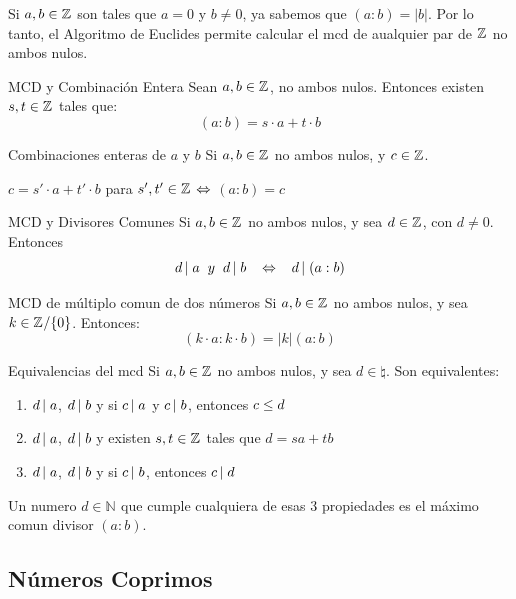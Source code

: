 \documentclass[10pt]{article}
\newcommand{\nat}[1]{\mathbb{N}^{#1}}
\begin{document}
\begin{obs}{}
 Si $a, b \in \entero{}$ son tales que $a=0$ y $b \neq 0$, ya sabemos que $(a:b) = |b|$. Por lo tanto, el Algoritmo de Euclides permite calcular el mcd de aualquier par de $\entero{}$ no ambos nulos.
\end{obs}

\begin{teo}{MCD y Combinación Entera}
 Sean $a, b \in \entero{}$, no ambos nulos. Entonces existen $s, t \in \entero{}$ tales que:
 \[(a:b) = s \cdot a + t \cdot b\]
\end{teo}

\begin{obs}{Combinaciones enteras de $a$ y $b$}
Si $a, b \in \entero{}$ no ambos nulos, y $c \in \entero{}$.
\begin{center}
 $c = s' \cdot a + t' \cdot b$ para $s', t' \in \entero{}$ $\sii$ $(a:b) = c$
\end{center}
\end{obs}

\begin{propo}{MCD y Divisores Comunes}
Si $a, b \in \entero{}$ no ambos nulos,  y sea $d \in \entero{}$, con $d \neq 0$. Entonces
\[\divi{d}{a} \es{0.2} y \es{0.2} \divi{d}{b} \es{0.3} \sii \es{0.3} \divi{d}{(a:b)}\]
\end{propo}

\begin{propo}{MCD de múltiplo comun de dos números}
 Si $a, b \in \entero{}$ no ambos nulos, y sea $k \in \entero{} / \{0\}$. Entonces:
 \[(k \cdot a : k \cdot b) = |k| (a:b)\]
\end{propo}

\begin{teo}{Equivalencias del mcd}
 Si $a, b \in \entero{}$ no ambos nulos,  y sea $d \in \natural{}$. Son equivalentes:
 \begin{enumerate}
  \item $\divi{d}{a}$, $\divi{d}{b}$ y si $\divi{c}{a}$ y $\divi{c}{b}$, entonces $c \menig d$
  \item $\divi{d}{a}$, $\divi{d}{b}$ y existen $s, t \in \entero{}$ tales que 
  $d = s a + t b$
  \item $\divi{d}{a}$, $\divi{d}{b}$ y si $\divi{c}{b}$, entonces $\divi{c}{d}$
 \end{enumerate}
Un numero $d \in \nat{}$ que cumple cualquiera de esas $3$ propiedades es el máximo comun divisor $(a:b)$.
\end{teo}


\begin{center}
\subsection{Números Coprimos} 
\end{center}
\end{document}

